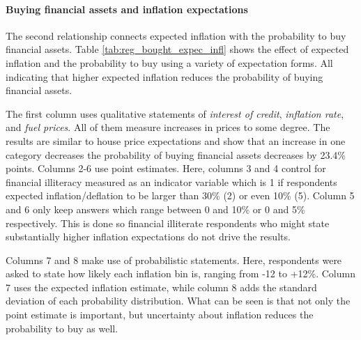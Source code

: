 \documentclass[ProjectABM]{subfiles}
\begin{document}
\paragraph{Buying financial assets and inflation expectations}
The second relationship connects expected inflation with the probability to buy financial assets. %
Table \ref{tab:reg_bought_expec_infl} shows the effect of expected inflation and the probability to buy using a variety of expectation forms. All indicating that higher expected inflation reduces the probability of buying financial assets.

The first column uses qualitative statements of \textit{interest of credit}, \textit{inflation rate}, and \textit{fuel prices}. All of them measure increases in prices to some degree. The results are similar to house price expectations and show that an increase in one category decreases the probability of buying financial assets decreases by 23.4\% points. Columns 2-6 use point estimates. Here, columns 3 and 4 control for financial illiteracy measured as an indicator variable which is 1 if respondents expected inflation/deflation to be larger than 30\% (2) or even 10\% (5). Column 5 and 6 only keep answers which range between 0 and 10\% or 0 and 5\% respectively. This is done so financial illiterate respondents who might state substantially higher inflation expectations do not drive the results.

Columns 7 and 8 make use of probabilistic statements. Here, respondents were asked to state how likely each inflation bin is, ranging from -12 to +12\%. Column 7 uses the expected inflation estimate, while column 8 adds the standard deviation of each probability distribution. What can be seen is that not only the point estimate is important, but uncertainty about inflation reduces the probability to buy as well.





\end{document}
